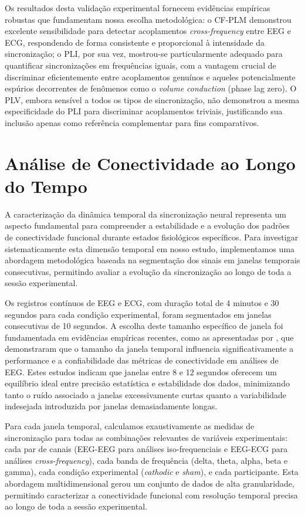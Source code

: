 Os resultados desta validação experimental fornecem evidências empíricas robustas que fundamentam nossa escolha metodológica: o CF-PLM demonstrou excelente sensibilidade para detectar acoplamentos \textit{cross-frequency} entre EEG e ECG, respondendo de forma consistente e proporcional à intensidade da sincronização; o PLI, por sua vez, mostrou-se particularmente adequado para quantificar sincronizações em frequências iguais, com a vantagem crucial de discriminar eficientemente entre acoplamentos genuínos e aqueles potencialmente espúrios decorrentes de fenômenos como o \textit{volume conduction} (phase lag zero). O PLV, embora sensível a todos os tipos de sincronização, não demonstrou a mesma especificidade do PLI para discriminar acoplamentos triviais, justificando sua inclusão apenas como referência complementar para fins comparativos.

\section{Análise de Conectividade ao Longo do Tempo}
\label{sec:connectivity_over_time}
A caracterização da dinâmica temporal da sincronização neural representa um aspecto fundamental para compreender a estabilidade e a evolução dos padrões de conectividade funcional durante estados fisiológicos específicos. Para investigar sistematicamente esta dimensão temporal em nosso estudo, implementamos uma abordagem metodológica baseada na segmentação dos sinais em janelas temporais consecutivas, permitindo avaliar a evolução da sincronização ao longo de toda a sessão experimental.

Os registros contínuos de EEG e ECG, com duração total de 4 minutos e 30 segundos para cada condição experimental, foram segmentados em janelas consecutivas de 10 segundos. A escolha deste tamanho específico de janela foi fundamentada em evidências empíricas recentes, como as apresentadas por , que demonstraram que o tamanho da janela temporal influencia significativamente a performance e a confiabilidade das métricas de conectividade em análises de EEG. Estes estudos indicam que janelas entre 8 e 12 segundos oferecem um equilíbrio ideal entre precisão estatística e estabilidade dos dados, minimizando tanto o ruído associado a janelas excessivamente curtas quanto a variabilidade indesejada introduzida por janelas demasiadamente longas.

Para cada janela temporal, calculamos exaustivamente as medidas de sincronização para todas as combinações relevantes de variáveis experimentais: cada par de canais (EEG-EEG para análises iso-frequenciais e EEG-ECG para análises \textit{cross-frequency}), cada banda de frequência (delta, theta, alpha, beta e gamma), cada condição experimental (\textit{cathodic} e \textit{sham}), e cada participante. Esta abordagem multidimensional gerou um conjunto de dados de alta granularidade, permitindo caracterizar a conectividade funcional com resolução temporal precisa ao longo de toda a sessão experimental.


